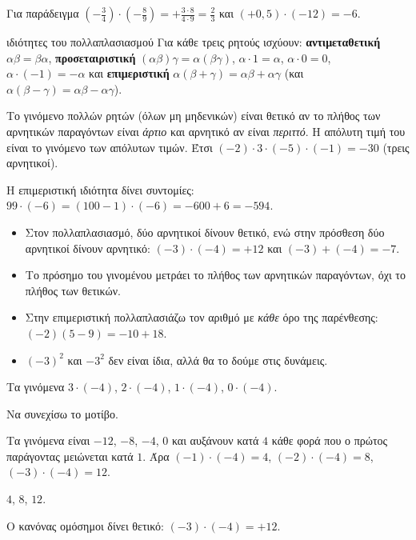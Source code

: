 Για παράδειγμα $\left(-\frac{3}{4}\right)\cdot\left(-\frac{8}{9}\right)=+\frac{3\cdot8}{4\cdot9}=\frac{2}{3}$ και $(+0{,}5)\cdot(-12)=-6$.

\begin{idiotita}{ιδιότητες του πολλαπλασιασμού}
Για κάθε τρεις ρητούς ισχύουν: \textbf{αντιμεταθετική} $\alpha\beta=\beta\alpha$, \textbf{προσεταιριστική} $(\alpha\beta)\gamma=\alpha(\beta\gamma)$, $\alpha\cdot1=\alpha$, $\alpha\cdot0=0$, $\alpha\cdot(-1)=-\alpha$ και \textbf{επιμεριστική} $\alpha(\beta+\gamma)=\alpha\beta+\alpha\gamma$ (και $\alpha(\beta-\gamma)=\alpha\beta-\alpha\gamma$).
\end{idiotita}


Το γινόμενο πολλών ρητών (όλων μη μηδενικών) είναι θετικό αν το πλήθος των αρνητικών παραγόντων είναι \emph{άρτιο} και αρνητικό αν είναι \emph{περιττό}. Η απόλυτη τιμή του είναι το γινόμενο των απόλυτων τιμών. Έτσι $(-2)\cdot3\cdot(-5)\cdot(-1)=-30$ (τρεις αρνητικοί).

Η επιμεριστική ιδιότητα δίνει συντομίες: $99\cdot(-6)=(100-1)\cdot(-6)=-600+6=-594$.

\begin{prosoxi}
\begin{itemize}[leftmargin=1.2em,itemsep=0.3ex,topsep=2pt]
\item Στον πολλαπλασιασμό, δύο αρνητικοί δίνουν θετικό, ενώ στην πρόσθεση δύο αρνητικοί δίνουν αρνητικό: $(-3)\cdot(-4)=+12$ και $(-3)+(-4)=-7$.
\item Το πρόσημο του γινομένου μετράει το πλήθος των αρνητικών παραγόντων, όχι το πλήθος των θετικών.
\item Στην επιμεριστική πολλαπλασιάζω τον αριθμό με \emph{κάθε} όρο της παρένθεσης: $(-2)(5-9)=-10+18$.
\item $(-3)^2$ και $-3^2$ δεν είναι ίδια, αλλά θα το δούμε στις δυνάμεις.
\end{itemize}
\end{prosoxi}


\tixero Τα γινόμενα $3\cdot(-4)$, $2\cdot(-4)$, $1\cdot(-4)$, $0\cdot(-4)$.\par
\tithelo Να συνεχίσω το μοτίβο.\par
\possindeo Τα γινόμενα είναι $-12$, $-8$, $-4$, $0$ και αυξάνουν κατά $4$ κάθε φορά που ο πρώτος παράγοντας μειώνεται κατά $1$. Άρα $(-1)\cdot(-4)=4$, $(-2)\cdot(-4)=8$, $(-3)\cdot(-4)=12$.\par
\apantisi $4$, $8$, $12$.\par
\elegxos Ο κανόνας ομόσημοι δίνει θετικό: $(-3)\cdot(-4)=+12$.

